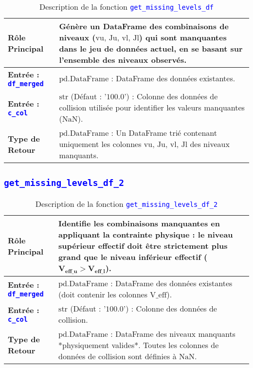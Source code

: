 \documentclass{article}
\newcommand{\code}[1]{\texttt{\textcolor{blue}{#1}}}
\begin{document}
\begin{longtable}{|>{\raggedright\arraybackslash}p{}|>{\raggedright\arraybackslash}p{}|}
    \caption{Description de la fonction \code{get\_missing\_levels\_df}} \\
    \toprule
    \textbf{Rôle Principal} & Génère un DataFrame des combinaisons de niveaux ($\text{vu, Ju, vl, Jl}$) qui sont \textbf{manquantes} dans le jeu de données actuel, en se basant sur l'ensemble des niveaux observés. \\
    \midrule
    \textbf{Entrée : \code{df\_merged}} & $\text{pd.DataFrame}$ : DataFrame des données existantes. \\
    \midrule
    \textbf{Entrée : \code{c\_col}} & $\text{str}$ (Défaut : $\text{'100.0'}$) : Colonne des données de collision utilisée pour identifier les valeurs manquantes ($\text{NaN}$). \\
    \midrule
    \textbf{Type de Retour} & $\text{pd.DataFrame}$ : Un DataFrame trié contenant uniquement les colonnes $\text{vu, Ju, vl, Jl}$ des niveaux manquants. \\
    \bottomrule
\end{longtable}

\subsection{\code{get\_missing\_levels\_df\_2}}

\begin{longtable}{|>{\raggedright\arraybackslash}p{}|>{\raggedright\arraybackslash}p{}|}
    \caption{Description de la fonction \code{get\_missing\_levels\_df\_2}} \\
    \toprule
    \textbf{Rôle Principal} & Identifie les combinaisons manquantes en appliquant la \textbf{contrainte physique} : le niveau supérieur effectif doit être strictement plus grand que le niveau inférieur effectif ($\mathbf{V_{\text{eff\_u}} > V_{\text{eff\_l}}}$). \\
    \midrule
    \textbf{Entrée : \code{df\_merged}} & $\text{pd.DataFrame}$ : DataFrame des données existantes (doit contenir les colonnes $\text{V\_eff}$). \\
    \midrule
    \textbf{Entrée : \code{c\_col}} & $\text{str}$ (Défaut : $\text{'100.0'}$) : Colonne des données de collision. \\
    \midrule
    \textbf{Type de Retour} & $\text{pd.DataFrame}$ : DataFrame des niveaux manquants *physiquement valides*. Toutes les colonnes de données de collision sont définies à $\text{NaN}$. \\
    \bottomrule
\end{longtable}
\end{document}
